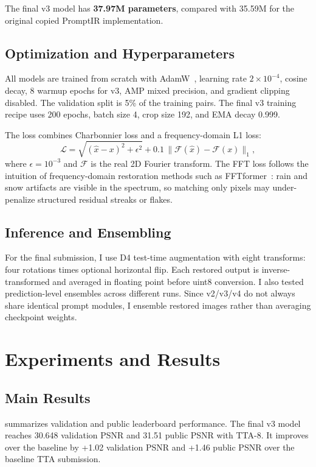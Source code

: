 \documentclass[10pt,twocolumn,letterpaper]{article}
\begin{document}
The final v3 model has \textbf{37.97M parameters}, compared with 35.59M for the original copied PromptIR implementation.

\subsection{Optimization and Hyperparameters}
All models are trained from scratch with AdamW~\cite{loshchilov2019adamw}, learning rate $2\times10^{-4}$, cosine decay, 8 warmup epochs for v3, AMP mixed precision, and gradient clipping disabled. The validation split is 5\% of the training pairs. The final v3 training recipe uses 200 epochs, batch size 4, crop size 192, and EMA decay 0.999.

The loss combines Charbonnier loss and a frequency-domain L1 loss:
\[
\mathcal{L}=\sqrt{(\hat{x}-x)^2+\epsilon^2}+0.1\,\|\mathcal{F}(\hat{x})-\mathcal{F}(x)\|_1,
\]
where $\epsilon=10^{-3}$ and $\mathcal{F}$ is the real 2D Fourier transform. The FFT loss follows the intuition of frequency-domain restoration methods such as FFTformer~\cite{kong2023fftformer}: rain and snow artifacts are visible in the spectrum, so matching only pixels may under-penalize structured residual streaks or flakes.

\subsection{Inference and Ensembling}
For the final submission, I use D4 test-time augmentation with eight transforms: four rotations times optional horizontal flip. Each restored output is inverse-transformed and averaged in floating point before uint8 conversion. I also tested prediction-level ensembles across different runs. Since v2/v3/v4 do not always share identical prompt modules, I ensemble restored images rather than averaging checkpoint weights.

\section{Experiments and Results}
\label{sec:results}

\subsection{Main Results}
 summarizes validation and public leaderboard performance. The final v3 model reaches 30.648 validation PSNR and 31.51 public PSNR with TTA-8. It improves over the baseline by +1.02 validation PSNR and +1.46 public PSNR over the baseline TTA submission.
\end{document}

